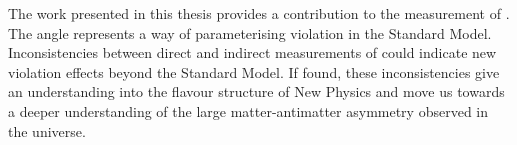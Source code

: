 The work presented in this thesis provides a contribution to the measurement of \Pgamma. The angle \Pgamma represents a way of parameterising \CP violation in the Standard Model. Inconsistencies between direct and indirect measurements of \Pgamma could indicate new \CP violation effects beyond the Standard Model. If found, these inconsistencies give an understanding into the flavour structure of New Physics and move us towards a deeper understanding of the large matter-antimatter asymmetry observed in the universe.
